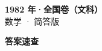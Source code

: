 \documentclass[zihao=-4, a4paper]{ctexart}
\begin{document}
\begin{center}
  {\Large\bfseries 1982 年·全国卷（文科）}\\[4pt]
  {\large 数学 · 简答版}
\end{center}
\medskip
{}

\clearpage
{}
\begin{center}{\Large\bfseries 答案速查}\end{center}
\medskip

\end{document}
